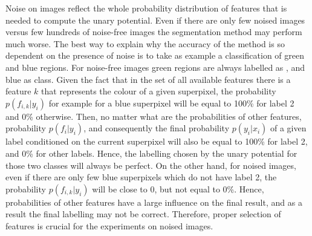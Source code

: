 Noise on images reflect the whole probability distribution of features that is needed to compute the unary potential. Even if there are only few noised images versus few hundreds of noise-free images the segmentation method may perform much worse. The best way to explain why the accuracy of the method is so dependent on the presence of noise is to take as example a classification of green and blue regions. For noise-free images green regions are always labelled as , and blue as  class. Given the fact that in the set of all available features there is a feature $k$ that represents the colour of a given superpixel, the  probability $p(f_{i,k}|y_i)$ for example for a blue superpixel will be equal to 100\% for label 2 and 0\% otherwise. Then, no matter what are the probabilities of other features, probability $p(f_i|y_i)$, and consequently the final probability $p(y_i|x_i)$ of a given label conditioned on the current superpixel will also be equal to 100\% for label 2, and 0\% for other labels. Hence, the labelling chosen by the unary potential for those two classes will always be perfect. On the other hand, for noised images, even if there are only few blue superpixels which do not have label 2, the probability $p(f_{i,k}|y_i)$ will be close to 0, but not equal to 0\%. Hence, probabilities of other features have a large influence on the final result, and as a result the final labelling may not be correct. Therefore, proper selection of features is crucial for the experiments on noised images.  

